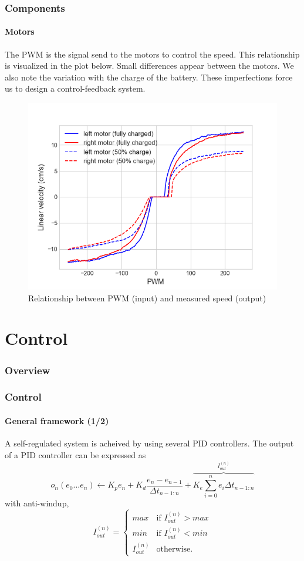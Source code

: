 \documentclass[10pt]{beamer}
\begin{document}
\begin{frame}
\frametitle{Components}
\framesubtitle{Motors}
The PWM is the signal send to the motors to control the speed. This relationship is visualized in the plot below. Small differences appear between the motors. We also note the variation with the charge of the battery. These imperfections force us to design a control-feedback system. 
\vspace*{-2mm}
\begin{figure}[hbtp]
\centering
\includegraphics[scale=0.45]{figures/motors_merged.png}
\vspace*{-2mm}
\caption{Relationship between PWM (input) and measured speed (output)}
\label{fig:pwm-speed}
\end{figure}
\end{frame}


\section{Control} 

\begin{frame}
\frametitle{Overview}
\tableofcontents[currentsection,subsectionstyle=shaded]
\end{frame}

\begin{frame}
\frametitle{Control}
\framesubtitle{General framework (1/2)}
A self-regulated system is acheived by using several PID controllers. The output of a PID controller can be expressed as
$$ 
o_n (e_0...e_n) \leftarrow K_p e_n + K_d\frac{e_n - e_{n-1}}{\Delta t_{n-1:n}} + \overbrace{K_e\sum_{i=0}^{n}{e_i \Delta t_{n-1:n}}}^{I_{out}^{(n)}}
$$
with anti-windup,
$$
I_{out}^{(n)} = \left\{
    \begin{array}{ll}
        max & \mbox{if } I_{out}^{(n)} > max \\
        min & \mbox{if } I_{out}^{(n)} < min \\
        I_{out}^{(n)} & \mbox{otherwise.}
    \end{array}
\right.
$$
\end{frame}
\end{document}
